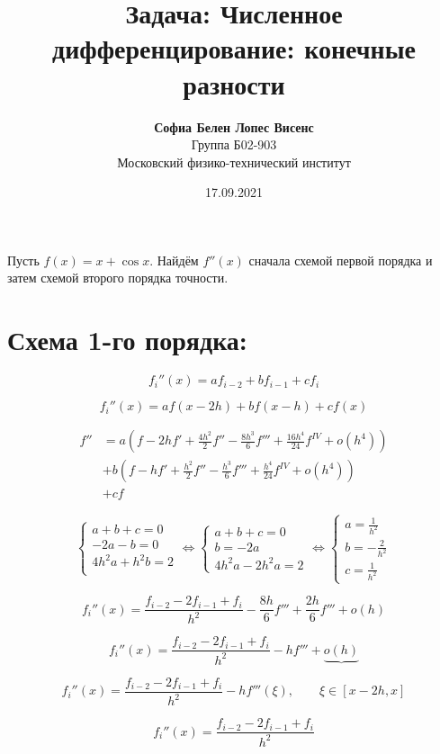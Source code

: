 \documentclass[a4paper,12pt]{article}
\author{\textbf{Софиа Белен Лопес Висенс}\\Группа Б02-903\\ \large Московский физико-технический институт}
\title{Задача: Численное дифференцирование: конечные разности}
\date{17.09.2021}
\begin{document}
\maketitle

Пусть \(f(x) = x + \cos x\).
Найдём \(f''(x)\) сначала схемой первой порядка и 
затем схемой второго порядка точности.

\section{Схема 1-го порядка: }

\[
    f_i''(x) = af_{i-2} + bf_{i - 1} + cf_i
\] 

\[
    f_i''(x) = af(x - 2h) + bf(x - h) + cf(x)
\] 

\begin{align*}
    f'' &= a \left(f - 2h f' + \frac{4h^2}{2}f''
    - \frac{8h^3}{6}f'''
    + \frac{16h^4}{24} f^{IV} + o (h^4) \right) \\
        &+ b \left(f - h f' + \frac{h^2}{2}f''
    - \frac{h^3}{6}f'''
    + \frac{h^4}{24} f^{IV} + o (h^4) \right) \\
        &+ cf
\end{align*}

\[
\begin{cases}
    a + b + c = 0 \\
    -2a - b = 0 \\
    4 h^2 a + h^2 b = 2 \\
\end{cases}
\iff
\begin{cases}
    a + b + c = 0 \\
    b = -2a \\
    4h^2 a - 2h^2 a = 2
\end{cases}
\iff
\begin{cases}
    a = \frac{1}{h^2} \\
    b = -\frac{2}{h^2} \\
    c = \frac{1}{h^2}
\end{cases}
\] 

\[
    f_i''(x) = \frac{f_{i - 2} - 2 f_{i - 1} + f_{i} }{h^2}
    - \frac{8h}{6} f'''
    + \frac{2h}{6} f'''
    + o(h)
\] 

\[
    f_i''(x) = \frac{f_{i - 2} - 2 f_{i - 1} + f_{i} }{h^2}
    - hf'''
    + \underbrace{o(h)}
\] 

\[
    f_i''(x) = \frac{f_{i - 2} - 2 f_{i - 1} + f_{i} }{h^2}
    - h f'''(\xi), \qquad \xi \in [x - 2h, x]
\] 

\[
    \boxed{f_i''(x) = \frac{f_{i - 2} - 2 f_{i - 1} + f_{i} }{h^2}}
\] 
\end{document}
